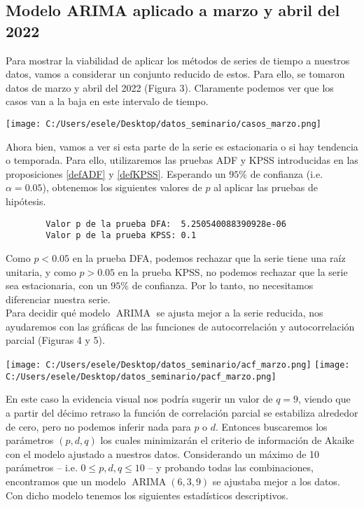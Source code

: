 \documentclass[11pt,letterpaper]{article}
\newcommand{\ARIMA}{\ensuremath{\operatorname{ARIMA}}}
\theoremstyle{definition}
\theoremstyle{theorem}
\theoremstyle{remark}
\begin{document}
	\subsection{Modelo ARIMA aplicado a marzo y abril del 2022}
	\noindent Para mostrar la viabilidad de aplicar los métodos de series de tiempo a nuestros datos, vamos a considerar un conjunto reducido de estos. Para ello, se tomaron datos de marzo y abril del 2022 (Figura 3). Claramente podemos ver que los casos van a la baja en este intervalo de tiempo.
	\begin{center}
		\texttt{[image: C:/Users/esele/Desktop/datos\_seminario/casos\_marzo.png]}
	\end{center}
	\par Ahora bien, vamos a ver si esta parte de la serie es estacionaria o si hay tendencia o temporada. Para ello, utilizaremos las pruebas ADF y KPSS introducidas en las proposiciones \ref{defADF} y \ref{defKPSS}. Esperando un \(95\%\) de confianza (i.e. \(\alpha=0.05\)), obtenemos los siguientes valores de \(p\) al aplicar las pruebas de hipótesis.
 	\begin{verbatim}
 		Valor p de la prueba DFA:  5.250540088390928e-06 
 		Valor p de la prueba KPSS: 0.1\end{verbatim}
 	\par Como \(p<0.05\) en la prueba DFA, podemos rechazar que la serie tiene una raíz unitaria, y como \(p>0.05\) en la prueba KPSS, no podemos rechazar que la serie sea estacionaria, con un \(95\%\) de confianza. Por lo tanto, no necesitamos diferenciar nuestra serie. \\
 	\indent Para decidir qué modelo \(\ARIMA\) se ajusta mejor a la serie reducida, nos ayudaremos con las gráficas de las funciones de autocorrelación y autocorrelación parcial (Figuras 4 y 5).
 	\begin{center}
 		\texttt{[image: C:/Users/esele/Desktop/datos\_seminario/acf\_marzo.png]}
 		\texttt{[image: C:/Users/esele/Desktop/datos\_seminario/pacf\_marzo.png]}
 	\end{center}
 	\par En este caso la evidencia visual nos podría sugerir un valor de \(q=9\), viendo que a partir del décimo retraso la función de correlación parcial se estabiliza alrededor de cero, pero no podemos inferir nada para \(p\) o \(d\). Entonces buscaremos los parámetros \((p,d,q)\) los cuales minimizarán el criterio de información de Akaike con el modelo ajustado a nuestros datos. Considerando un máximo de 10 parámetros -- i.e. \(0\leq p,d,q\leq10\) -- y probando todas las combinaciones, encontramos que un modelo \(\ARIMA(6,3,9)\) se ajustaba mejor a los datos. Con dicho modelo tenemos los siguientes estadísticos descriptivos.
\end{document}
